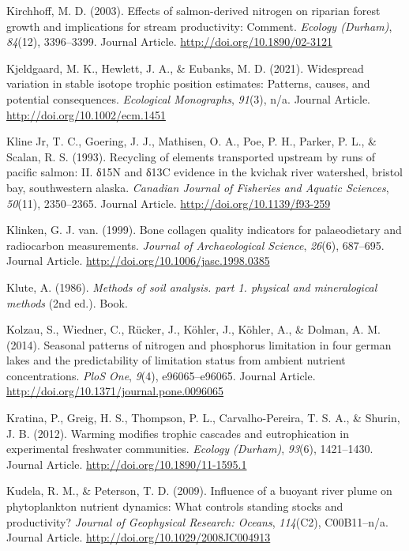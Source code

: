 \documentclass [11pt, proquest] {uwthesis}[2015/03/03]
\begin{document}
\hypertarget{ref-Kirchoff2003}{}
Kirchhoff, M. D. (2003). Effects of salmon-derived nitrogen on riparian
forest growth and implications for stream productivity: Comment.
\emph{Ecology (Durham)}, \emph{84}(12), 3396--3399. Journal Article.
\url{http://doi.org/10.1890/02-3121}

\hypertarget{ref-Kjeldgaard2021}{}
Kjeldgaard, M. K., Hewlett, J. A., \& Eubanks, M. D. (2021). Widespread
variation in stable isotope trophic position estimates: Patterns,
causes, and potential consequences. \emph{Ecological Monographs},
\emph{91}(3), n/a. Journal Article.
\url{http://doi.org/10.1002/ecm.1451}

\hypertarget{ref-Kline1993}{}
Kline Jr, T. C., Goering, J. J., Mathisen, O. A., Poe, P. H., Parker, P.
L., \& Scalan, R. S. (1993). Recycling of elements transported upstream
by runs of pacific salmon: II. δ15N and δ13C evidence in the kvichak
river watershed, bristol bay, southwestern alaska. \emph{Canadian
Journal of Fisheries and Aquatic Sciences}, \emph{50}(11), 2350--2365.
Journal Article. \url{http://doi.org/10.1139/f93-259}

\hypertarget{ref-vanKlinken1999}{}
Klinken, G. J. van. (1999). Bone collagen quality indicators for
palaeodietary and radiocarbon measurements. \emph{Journal of
Archaeological Science}, \emph{26}(6), 687--695. Journal Article.
\url{http://doi.org/10.1006/jasc.1998.0385}

\hypertarget{ref-Klute1986}{}
Klute, A. (1986). \emph{Methods of soil analysis. part 1. physical and
mineralogical methods} (2nd ed.). Book.

\hypertarget{ref-Kolzau2014}{}
Kolzau, S., Wiedner, C., Rücker, J., Köhler, J., Köhler, A., \& Dolman,
A. M. (2014). Seasonal patterns of nitrogen and phosphorus limitation in
four german lakes and the predictability of limitation status from
ambient nutrient concentrations. \emph{PloS One}, \emph{9}(4),
e96065--e96065. Journal Article.
\url{http://doi.org/10.1371/journal.pone.0096065}

\hypertarget{ref-Kratina2012}{}
Kratina, P., Greig, H. S., Thompson, P. L., Carvalho-Pereira, T. S. A.,
\& Shurin, J. B. (2012). Warming modifies trophic cascades and
eutrophication in experimental freshwater communities. \emph{Ecology
(Durham)}, \emph{93}(6), 1421--1430. Journal Article.
\url{http://doi.org/10.1890/11-1595.1}

\hypertarget{ref-Kudela2009}{}
Kudela, R. M., \& Peterson, T. D. (2009). Influence of a buoyant river
plume on phytoplankton nutrient dynamics: What controls standing stocks
and productivity? \emph{Journal of Geophysical Research: Oceans},
\emph{114}(C2), C00B11--n/a. Journal Article.
\url{http://doi.org/10.1029/2008JC004913}
\end{document}
